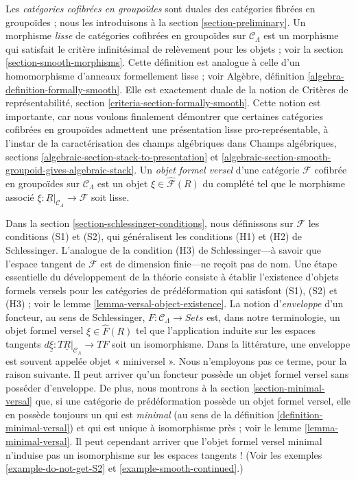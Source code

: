 \medskip\noindent
Les {\it catégories cofibrées en groupoïdes} sont duales des catégories
fibrées en groupoïdes ; nous les introduisons à la section
\ref{section-preliminary}. Un morphisme {\it lisse} de catégories cofibrées
en groupoïdes sur $\mathcal{C}_\Lambda$ est un morphisme qui satisfait le
critère infinitésimal de relèvement pour les objets ; voir la
section \ref{section-smooth-morphisms}.
Cette définition est analogue à celle d'un homomorphisme d'anneaux
formellement lisse ; voir Algèbre, définition
\ref{algebra-definition-formally-smooth}. Elle est exactement duale de la
notion de Critères de représentabilité, section
\ref{criteria-section-formally-smooth}. Cette notion est importante, car nous
voulons finalement démontrer que certaines catégories cofibrées en groupoïdes
admettent une présentation lisse pro-représentable, à l'instar de la
caractérisation des champs algébriques dans Champs algébriques, sections
\ref{algebraic-section-stack-to-presentation} et
\ref{algebraic-section-smooth-groupoid-gives-algebraic-stack}.
Un {\it objet formel versel} d'une catégorie $\mathcal{F}$ cofibrée en
groupoïdes sur $\mathcal{C}_\Lambda$ est un objet
$\xi \in \widehat{\mathcal{F}}(R)$ du complété tel que le morphisme
associé
$\underline{\xi} : \underline{R}|_{\mathcal{C}_\Lambda} \to \mathcal{F}$
soit lisse.

\medskip\noindent
Dans la section \ref{section-schlessinger-conditions}, nous définissons sur
$\mathcal{F}$ les conditions (S1) et (S2), qui généralisent les conditions
(H1) et (H2) de Schlessinger. L'analogue de la condition (H3) de
Schlessinger---à savoir que l'espace tangent de $\mathcal{F}$ est de dimension
finie---ne reçoit pas de nom. Une étape essentielle du développement de la
théorie consiste à établir l'existence d'objets formels versels pour les
catégories de prédéformation qui satisfont (S1), (S2) et (H3) ; voir le
lemme \ref{lemma-versal-object-existence}.
La notion d'{\it enveloppe} d'un foncteur, au sens de Schlessinger,
$F : \mathcal{C}_\Lambda \to \textit{Sets}$
est, dans notre terminologie, un objet formel versel
$\xi \in \widehat{F}(R)$ tel que l'application induite sur les espaces tangents
$d\underline{\xi} : T\underline{R}|_{\mathcal{C}_\Lambda} \to TF$
soit un isomorphisme. Dans la littérature, une enveloppe est souvent appelée
objet « miniversel ». Nous n'employons pas ce terme, pour la raison suivante.
Il peut arriver qu'un foncteur possède un objet formel versel sans posséder
d'enveloppe. De plus, nous montrons à la section
\ref{section-minimal-versal} que, si une catégorie de prédéformation possède
un objet formel versel, elle en possède toujours un qui est {\it minimal}
(au sens de la définition \ref{definition-minimal-versal}) et qui est unique
à isomorphisme près ; voir le lemme \ref{lemma-minimal-versal}.
Il peut cependant arriver que l'objet formel versel minimal n'induise pas
un isomorphisme sur les espaces tangents ! (Voir les exemples
\ref{example-do-not-get-S2} et
\ref{example-smooth-continued}.)

